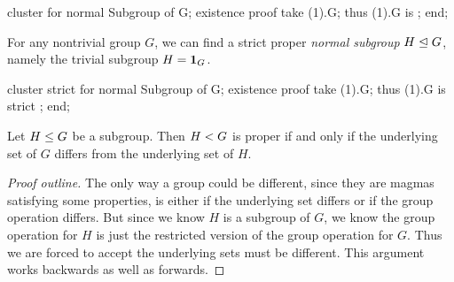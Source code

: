 \nwenddocs{}\endmoddef\nwstartdeflinemarkup{}\nwenddeflinemarkup
cluster  for normal Subgroup of G;
existence
proof
  take (1).G;
  thus (1).G is ;
end;
\nwendcode{}\nwdocspar

\begin{registration}
For any nontrivial group $G$, we can find a strict proper \emph{normal
subgroup} $H\trianglelefteq G$, namely the trivial subgroup
$H=\mathbf{1}_{G}$.
\end{registration}

\nwenddocs{}\endmoddef\nwstartdeflinemarkup{}\nwenddeflinemarkup
cluster strict  for normal Subgroup of G;
existence
proof
  take (1).G;
  thus (1).G is strict ;
end;
\nwendcode{}\nwdocspar

\begin{theorem}
Let $H\leq G$ be a subgroup. Then $H< G$ is proper if
and only if the underlying set of $G$ differs from the underlying set of $H$.
\end{theorem}

\begin{proof}[Proof outline]
The only way a group could be different, since they are magmas
satisfying some properties, is either if the underlying set differs or
if the group operation differs. But since we know $H$ is a subgroup of
$G$, we know the group operation for $H$ is just the restricted version
of the group operation for $G$. Thus we are forced to accept the
underlying sets must be different. This argument works backwards as well
as forwards.
\end{proof}

